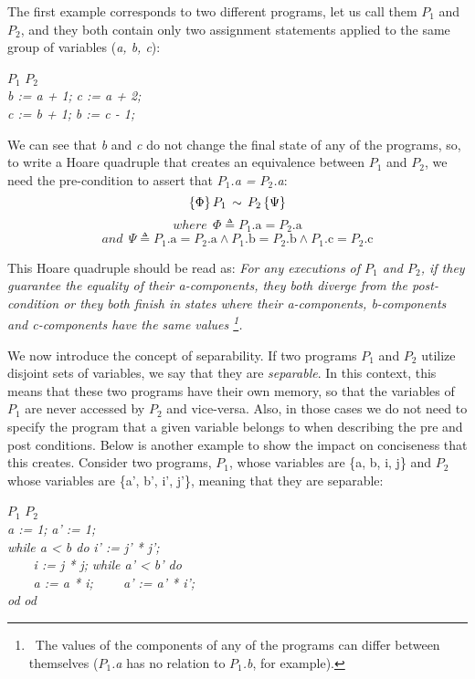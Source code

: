The first example corresponds to two different programs, let us call them \emph{$P_1$} and \emph{$P_2$}, and they both contain only two assignment statements applied to the same group of variables (\emph{a, b, c}): 
\begin{tabbing}
  \hspace{2cm}\= \emph{$P_1$} \hspace{2cm} \= \emph{$P_2$} \\ 
  \> \emph{b := a + 1;} \> \emph{c := a + 2;} \\
  \> \emph{c := b + 1;} \> \emph{b := c - 1;}
  \label{tabbing:simple_equivalent_program}
\end{tabbing}

We can see that \emph{b} and \emph{c} do not change the final state of any of the programs, so, to write a Hoare quadruple that creates an equivalence between \emph{$P_1$} and \emph{$P_2$}, we need the pre-condition to assert that \emph{$P_1$.a = $P_2$.a}:
\[ \{ \Phi \} \, \emph{$P_1$} \, \sim \, \emph{$P_2$} \, \{ \Psi \} \]
\vspace{-20pt}
\[ where \ \ \Phi \triangleq \text{$P_1$.a} = \text{$P_2$.a} \]
\vspace{-25pt}
\[ and \ \ \Psi \triangleq \text{$P_1$.a} = \text{$P_2$.a} \land \text{$P_1$.b} = \text{$P_2$.b} \land \text{$P_1$.c} = \text{$P_2$.c} \]

This Hoare quadruple should be read as: \emph{For any executions of $P_1$ and $P_2$, if they guarantee the equality of their a-components, they both diverge from the post-condition or they both finish in states where their a-components, b-components and c-components have the same values
\protect\footnote{\ The values of the components of any of the programs can differ between themselves (\emph{$P_1$.a} has no relation to \emph{$P_1$.b}, for example).}.}

We now introduce the concept of separability.
If two programs \emph{$P_1$} and \emph{$P_2$} utilize disjoint sets of variables, we say that they are \emph{separable}.
In this context, this means that these two programs have their own memory, so that the variables of \emph{$P_1$} are never accessed by \emph{$P_2$} and vice-versa.
Also, in those cases we do not need to specify the program that a given variable belongs to when describing the pre and post conditions.
Below is another example to show the impact on conciseness that this creates.
Consider two programs, \emph{$P_1$}, whose variables are \{{a, b, i, j}\} and \emph{$P_2$} whose variables are \{{a', b', i', j'}\}, meaning that they are separable:
\begin{tabbing}
  \hspace{3cm}\= \emph{$P_1$} \hspace{3cm} \= \emph{$P_2$} \\ 
  \> \emph{a := 1;} \> \emph{a' := 1;} \\
  \> \emph{while a < b do} \> \emph{i' := j' * j';} \\
  \> \emph{\ \ \ \ i := j * j;} \> \emph{while a' < b' do} \\
  \> \emph{\ \ \ \ a := a * i;} \> \emph{\ \ \ \ a' := a' * i';} \\
  \> \emph{od} \> \emph{od} 
\end{tabbing}

